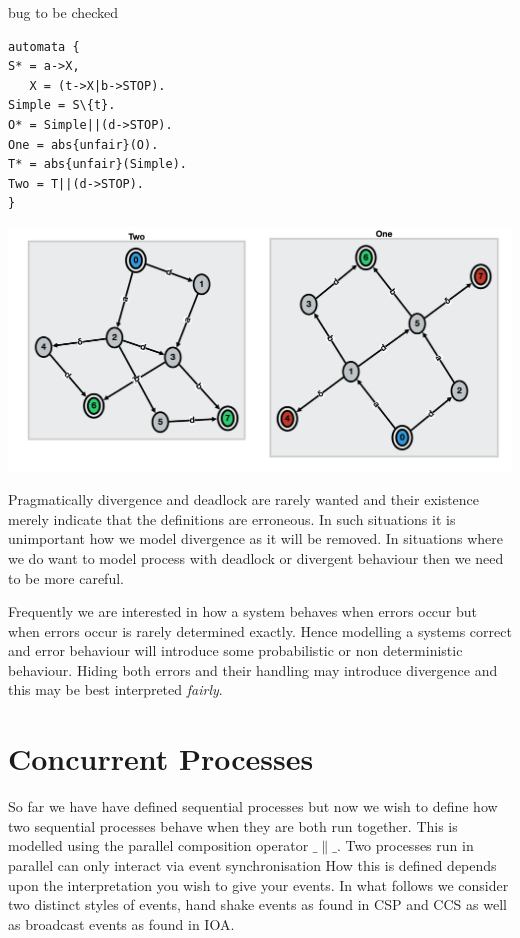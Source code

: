\documentclass[]{article}
\newcounter{dead1}
\newcounter{dead2}
\begin{document}
{\color{red} bug to be checked}
\noindent\begin{center}
\begin{minipage}{0.3\textwidth}
\begin{verbatim}
automata {
S* = a->X,
   X = (t->X|b->STOP).
Simple = S\{t}.
O* = Simple||(d->STOP).
One = abs{unfair}(O).
T* = abs{unfair}(Simple).
Two = T||(d->STOP).
}
\end{verbatim}\end{minipage}
\begin{minipage}{0.5\textwidth}
\includegraphics[scale=0.3]{OneTwo.png}
\end{minipage}\end{center}
Pragmatically divergence and deadlock are rarely wanted and their existence merely indicate that the definitions are erroneous. In such situations it is unimportant how we model divergence as it will be removed. In situations where we do want to model process with deadlock  or divergent behaviour then we need to be more careful.


Frequently we are interested in how a system behaves when errors occur but when errors occur is rarely determined exactly. Hence modelling a systems correct and error behaviour will introduce some probabilistic or non deterministic behaviour. Hiding both errors and their handling may introduce divergence and this may be best interpreted \emph{fairly}.


\section{Concurrent Processes }
So far we have have defined sequential processes but now we wish to define how two sequential processes behave when they are both run together. This is modelled using the parallel composition operator $\_\parallel\_$.
Two processes run in parallel can only interact via event synchronisation How this is defined depends upon the interpretation you wish to give your events. In what follows we consider two distinct styles of events, hand shake events as found in CSP and CCS as well as broadcast events as found in IOA.
\end{document}
